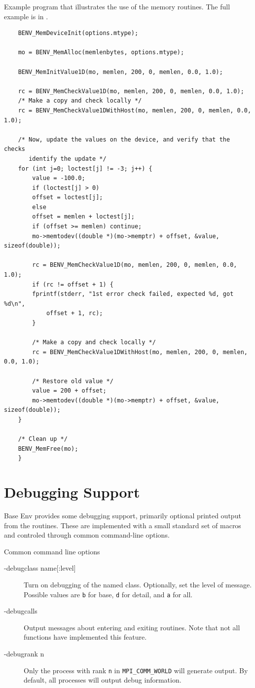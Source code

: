 \documentclass[11pt,letterpaper]{report}
\begin{document}
Example program that illustrates the use of the memory routines. The full example is in
.
\begin{verbatim}
	BENV_MemDeviceInit(options.mtype);

	mo = BENV_MemAlloc(memlenbytes, options.mtype);

	BENV_MemInitValue1D(mo, memlen, 200, 0, memlen, 0.0, 1.0);

	rc = BENV_MemCheckValue1D(mo, memlen, 200, 0, memlen, 0.0, 1.0);
	/* Make a copy and check locally */
	rc = BENV_MemCheckValue1DWithHost(mo, memlen, 200, 0, memlen, 0.0, 1.0);

	/* Now, update the values on the device, and verify that the checks
	   identify the update */
	for (int j=0; loctest[j] != -3; j++) {
	    value = -100.0;
	    if (loctest[j] > 0)
		offset = loctest[j];
	    else
		offset = memlen + loctest[j];
	    if (offset >= memlen) continue;
	    mo->memtodev((double *)(mo->memptr) + offset, &value, sizeof(double));

	    rc = BENV_MemCheckValue1D(mo, memlen, 200, 0, memlen, 0.0, 1.0);
	    if (rc != offset + 1) {
		fprintf(stderr, "1st error check failed, expected %d, got %d\n",
			offset + 1, rc);
	    }

	    /* Make a copy and check locally */
	    rc = BENV_MemCheckValue1DWithHost(mo, memlen, 200, 0, memlen, 0.0, 1.0);

	    /* Restore old value */
	    value = 200 + offset;
	    mo->memtodev((double *)(mo->memptr) + offset, &value, sizeof(double));
	}

	/* Clean up */
	BENV_MemFree(mo);
    }
\end{verbatim}

\chapter{Debugging Support}
Base Env provides some debugging support, primarily optional printed
output from the routines. These are implemented with a small standard set
of macros and controled through common command-line options.

Common command line options
\begin{description}
\item[-debugclass name{[}:level{]}]Turn on debugging of the named
  class. Optionally, set the level of message. Possible values are
  \texttt{b} for base, \texttt{d} for detail, and \texttt{a} for all.
\item[-debugcalls]Output messages about entering and exiting
  routines. Note that not all functions have implemented this feature.
\item[-debugrank n]Only the process with rank \texttt{n} in
  \texttt{MPI\_COMM\_WORLD} will generate output. By default, all
  processes will output debug information.
\end{description}
\end{document}
